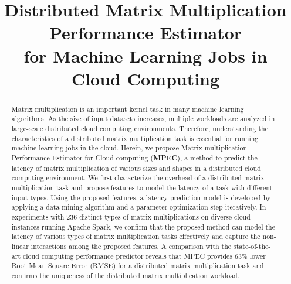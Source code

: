 \documentclass[10pt, conference, compsocconf]{IEEEtran}
\begin{document}

\title{Distributed Matrix Multiplication Performance Estimator \\for Machine Learning Jobs in Cloud Computing}

\author{
\and
{}
}

\maketitle

\begin{abstract}
  Matrix multiplication is an important kernel task in many machine learning algorithms. As the size of input datasets increases, multiple workloads are analyzed in large-scale distributed cloud computing environments. Therefore, understanding the characteristics of a distributed matrix multiplication task is essential for running machine learning jobs in the cloud. Herein, we propose Matrix multiplication Performance Estimator for Cloud computing (\textbf{MPEC}), a method to predict the latency of matrix multiplication of various sizes and shapes in a distributed cloud computing environment. We first characterize the overhead of a distributed matrix multiplication task and propose features to model the latency of a task with different input types. Using the proposed features, a latency prediction model is developed by applying a data mining algorithm and a parameter optimization step iteratively. In experiments with 236 distinct types of matrix multiplications on diverse cloud instances running Apache Spark, we confirm that the proposed method can model the latency of various types of matrix multiplication tasks effectively and capture the non-linear interactions among the proposed features. A comparison with the state-of-the-art cloud computing performance predictor reveals that MPEC provides 63\% lower Root Mean Square Error (RMSE) for a distributed matrix multiplication task and confirms the uniqueness of the distributed matrix multiplication workload.
\end{abstract}
\end{document}
